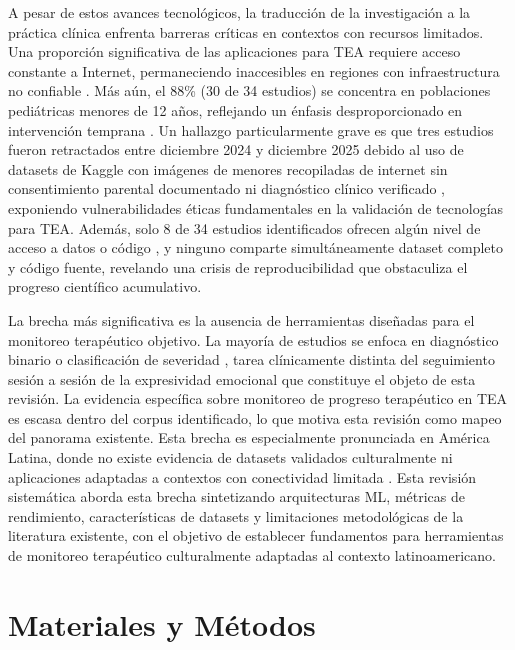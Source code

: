 \documentclass[3p,twocolumn,times]{elsarticle}
\begin{document}
	A pesar de estos avances tecnológicos, la traducción de la investigación a la
	práctica clínica enfrenta barreras críticas en contextos con recursos limitados.
	Una proporción significativa de las aplicaciones para TEA requiere acceso constante
	a Internet, permaneciendo inaccesibles en regiones con infraestructura no confiable
	\cite{Levy2024}. Más aún, el 88\% (30 de 34 estudios) se concentra en poblaciones
	pediátricas menores de 12 años, reflejando un énfasis desproporcionado en
	intervención temprana \cite{Washington2022}. Un hallazgo particularmente grave es que tres estudios fueron retractados entre diciembre 2024 y diciembre 2025 debido al uso de datasets de Kaggle con imágenes de menores recopiladas de internet sin consentimiento parental
	documentado ni diagnóstico clínico verificado \cite{Gungor2025,Mahmood2025,Kumar2024},
	exponiendo vulnerabilidades éticas fundamentales en la validación de tecnologías
	para TEA. Además, solo 8 de 34 estudios identificados ofrecen algún nivel de acceso
	a datos o código \cite{Sariyanidi2025,Hassan2025}, y ninguno comparte simultáneamente
	dataset completo y código fuente, revelando una crisis de reproducibilidad que
	obstaculiza el progreso científico acumulativo.
	
	La brecha más significativa es la ausencia de herramientas diseñadas para el
	monitoreo terapéutico objetivo. La mayoría de estudios se enfoca en diagnóstico
	binario o clasificación de severidad \cite{Alsubai2025}, tarea clínicamente distinta
	del seguimiento sesión a sesión de la expresividad emocional que constituye el objeto
	de esta revisión. La evidencia específica sobre monitoreo de progreso terapéutico en
	TEA es escasa dentro del corpus identificado, lo que motiva esta revisión como mapeo
	del panorama existente. Esta brecha es especialmente pronunciada en América Latina,
	donde no existe evidencia de datasets validados culturalmente ni aplicaciones
	adaptadas a contextos con conectividad limitada \cite{Lecciso2021,Rudovic2018}. Esta
	revisión sistemática aborda esta brecha sintetizando arquitecturas ML, métricas de
	rendimiento, características de datasets y limitaciones metodológicas de la
	literatura existente, con el objetivo de establecer fundamentos para herramientas de
	monitoreo terapéutico culturalmente adaptadas al contexto latinoamericano.
	
	\section{Materiales y Métodos}\label{sec2}
	
\end{document}

